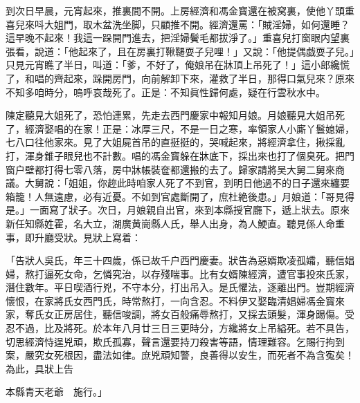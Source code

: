 到次日早晨，元宵起來，推裏間不開。上房經濟和馮金寳還在被窝裏，使他丫頭重喜兒來呌大姐門，取木盆洗坐脚，只顧推不開。經濟還罵：「賊淫婦，如何還睡？這早晚不起來！我這一跺開門進去，把淫婦鬢毛都拔淨了。」重喜兒打窗眼内望裏張看，說道：「他起來了，且在房裏打鞦韆耍子兒哩！」又說：「他提偶戯耍子兒。」只見元宵瞧了半日，叫道：「爹，不好了，俺娘吊在牀頂上吊死了！」這小郎纔慌了，和唱的齊起來，跺開房門，向前解卸下來，灌救了半日，那得口氣兒來？原來不知多咱時分，嗚呼哀哉死了。正是：不知眞性歸何處，疑在行雲秋水中。

陳定聽見大姐死了，恐怕連累，先走去西門慶家中報知月娘。月娘聽見大姐吊死了，經濟娶唱的在家！正是：冰厚三尺，不是一日之寒，率領家人小廝丫鬟媳婦，七八口往他家來。見了大姐屍首吊的直挺挺的，哭喊起來，將經濟拿住，揪採亂打，渾身錐子眼兒也不計數。唱的馮金寳躲在牀底下，採出來也打了個臭死。把門窗户壁都打得七零八落，房中牀帳裝奩都還搬的去了。歸家請將吴大舅二舅來商議。大舅說：「姐姐，你趂此時咱家人死了不到官，到明日他過不的日子還來纏要箱籠！人無遠慮，必有近憂。不如到官處斷開了，庶杜絶後患。」月娘道：「哥見得是。」一面寫了狀子。次日，月娘親自出官，來到本縣授官廳下，遞上狀去。原來新任知縣姓霍，名大立，湖廣黄崗縣人氏，舉人出身，為人鯁直。聽見係人命重事，即升廳受狀。見狀上寫着：

「告狀人吳氏，年三十四歲，係已故千户西門慶妻。狀告為惡婿欺凌孤孀，聽信娼婦，熬打逼死女命，乞憐究治，以存殘喘事。比有女婿陳經濟，遭官事投來氏家，潛住數年。平日喫酒行兇，不守本分，打出吊入。是氏懼法，逐離出門。豈期經濟懷恨，在家將氏女西門氏，時常熬打，一向含忍。不料伊又娶臨清娼婦馮金寳來家，奪氏女正房居住，聽信唆調，將女百般痛辱熬打，又採去頭髮，渾身踢傷。受忍不過，比及將死。於本年八月廿三日三更時分，方纔將女上吊縊死。若不具告，切思經濟恃逞兇頑，欺氏孤寡，聲言還要持刀殺害等語，情理難容。乞賜行拘到案，嚴究女死根因，盡法如律。庶兇頑知警，良善得以安生，而死者不為含寃矣！為此，具狀上告

本縣青天老爺　施行。」

